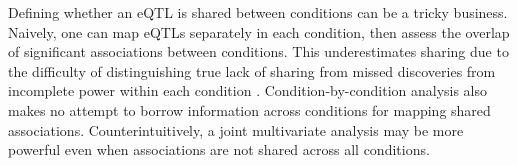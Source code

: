Defining whether an \gls{eQTL} is shared between conditions can be a tricky business.
Naively, one can map \glspl{eQTL} separately in each condition, then assess the overlap of significant associations between conditions.
This underestimates sharing due to the difficulty of distinguishing true lack of sharing from missed discoveries from incomplete power within each condition \autocite{flutre2013StatisticalFrameworkJoint,peters2016InsightGenotypePhenotypeAssociations}.
Condition-by-condition analysis also makes no attempt to borrow information across conditions for mapping shared associations\autocite{flutre2013StatisticalFrameworkJoint,urbut2018FlexibleStatisticalMethods,li2018HTeQTLIntegrativeExpression}.
Counterintuitively, a joint multivariate analysis may be more powerful even when associations are not shared across all conditions\autocite{stephens2013UnifiedFrameworkAssociation}.

